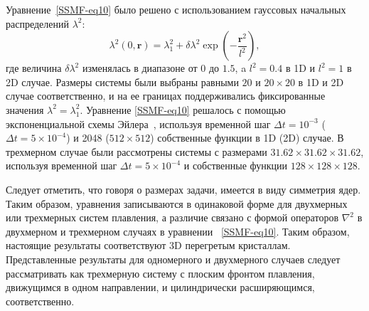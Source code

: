 Уравнение~\eqref{SSMF-eq10} было решено с использованием гауссовых начальных распределений $ \lambda ^ 2$:
\begin{equation}
\label{SSMF-eq11}
\lambda^2(0, \mathbf{r}) = \lambda^2_1 + \delta\lambda^2 \exp\left(-\frac{\mathbf{r}^2}{l^2}\right),
\end{equation}
где величина $ \delta\lambda^2$ изменялась в диапазоне от $ 0 $ до $ 1.5 $, a $ l ^ 2 = 0.4 $ в 1D и $ l ^ 2 = 1 $ в 2D случае.
Размеры системы были выбраны равными $20$ и $20 \times 20 $ в 1D и 2D случае соответственно, и на ее границах поддерживались фиксированные значения $\lambda^2= \lambda_1 ^ 2 $.
Уравнение \eqref{SSMF-eq10} решалось с помощью экспоненциальной схемы Эйлера~\cite{10.1098/rspa.2008.0325}, используя временной шаг $\Delta t=10^{-3}$ ($\Delta t=5\times10^{-4}$) и
2048 ($512\times512$) собственные функции в 1D (2D) случае. В трехмерном случае были рассмотрены системы с размерами $31.62 \times 31.62 \times 31.62$, используя временной шаг $\Delta t = 5 \times 10 ^ {-4}$ и собственные функции $128 \times 128 \times 128 $.

Следует отметить, что говоря о размерах задачи, имеется в виду симметрия ядер. Таким образом, уравнения записываются в одинаковой форме для двухмерных или трехмерных систем плавления, а различие связано с формой операторов $\nabla ^ 2$ в двухмерном и трехмерном случаях в уравнении ~\eqref{SSMF-eq10}. Таким образом, настоящие результаты соответствуют 3D перегретым кристаллам. Представленные результаты для одномерного и двухмерного случаев следует рассматривать как трехмерную систему с плоским фронтом плавления, движущимся в одном направлении, и цилиндрически расширяющимся, соответственно.

